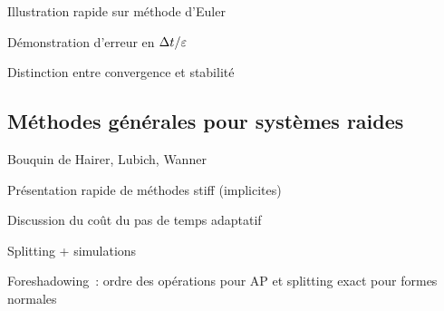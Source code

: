 Illustration rapide sur méthode d'Euler

Démonstration d'erreur en $\Delta t/\varepsilon$

Distinction entre convergence et stabilité



\subsection*{Méthodes générales pour systèmes raides}

Bouquin de Hairer, Lubich, Wanner

Présentation rapide de méthodes stiff (implicites)

Discussion du coût du pas de temps adaptatif

Splitting + simulations

Foreshadowing~: ordre des opérations pour AP et splitting exact pour
formes normales